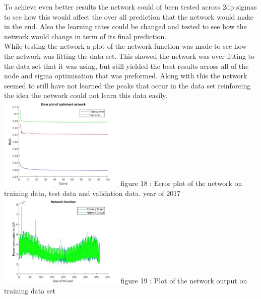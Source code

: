 \documentclass{IEEEtran}[11pt]
\begin{document}
\begin{flushleft}
  To achieve even better results the network could of been tested across 2dp sigmas
  to see how this would affect the over all prediction that the network would
  make in the end. Also the learning rates could be changed and tested to
  see how the network would change in term of its final prediction.
  \\
  \vspace{1.5mm}
  While testing the network a plot of the network function was made to see how
  the network was fitting the data set. This showed the network was over fitting
  to the data set that it was using, but still yielded the best results across
  all of the node and sigma optimisation that was preformed. Along with this the
  network seemed to still have not learned the peaks that occur in the data set
  reinforcing the idea the network could not learn this data easily.
  \\
  \space{1.5mm}
  \includegraphics[width = 0.45\textwidth]{errorPrediction.jpg}
  \vspace{1.5mm}
  {\footnotesize figure 18 : Error plot of the network on training data, test data
  and validation data.
  year of 2017 }
  \\
  \vspace{1.5mm}
  \includegraphics[width = 0.45\textwidth]{predictiontrainingdata.jpg}
  \vspace{1.5mm}
  {\footnotesize figure 19 : Plot of the network output on training data set }
  \\
  \vspace{1.5mm}


\end{flushleft}
\end{document}
